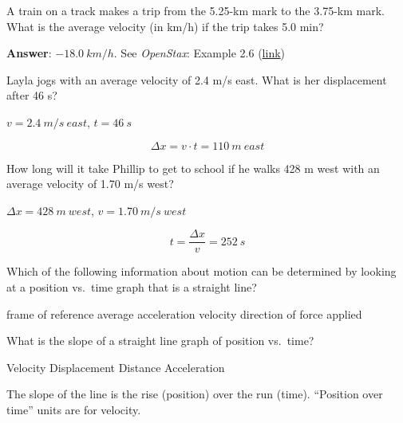 \documentclass[answers]{exam}
\begin{document}
\begin{questions}
\begin{questions}
\question
A train on a track makes a trip from the 5.25-km mark to the 3.75-km mark. What is the average velocity (in km/h) if the trip takes 5.0 min?

\begin{solution}
    \textbf{Answer}: $\SI{-18.0}{km/h}$. See \textit{OpenStax}: Example 2.6 (\href{https://openstax.org/books/college-physics/pages/2-4-acceleration}{link})
\end{solution}

\question
Layla jogs with an average velocity of 2.4 m/s east. What is her displacement after 46 s?

\begin{solution}
    $v = \SI{2.4}{m/s\ east}$, $t = \SI{46}{s}$

\begin{equation*}
    \Delta{x} = v \cdot t = \SI{110}{m\ east}
\end{equation*}
\end{solution}


\question
How long will it take Phillip to get to school if he walks 428 m west with an average velocity of 1.70 m/s west?

\begin{solution}
    $\Delta{x} = \SI{428}{m\ west}$, $v = \SI{1.70}{m/s\ west}$

\begin{equation*}
    t = \frac{\Delta{x}}{v} = \SI{252}{s}
\end{equation*}
\end{solution}


\question
Which of the following information about motion can be determined by looking at a position vs.~time graph that is a straight line?

\begin{choices}
\choice frame of reference
\choice average acceleration
\CorrectChoice velocity
\choice direction of force applied
\end{choices}

\question
What is the slope of a straight line graph of position vs.~time?

\begin{choices}
\CorrectChoice Velocity
\choice Displacement
\choice Distance
\choice Acceleration
\end{choices}

\begin{solution}
The slope of the line is the rise (position) over the run (time). ``Position over time'' units are for velocity.
\end{solution}



\end{questions}
\end{questions}
\end{document}
